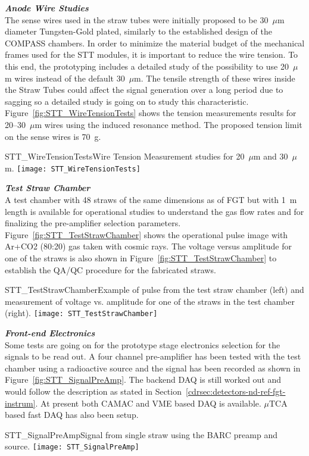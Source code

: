 \textbf{ \textit{Anode Wire Studies}} \\
The sense wires used in the straw tubes were initially proposed to be
30~$\mu$m diameter Tungsten-Gold plated, similarly to the established
design of the COMPASS chambers. In order to minimize the material
budget of the mechanical frames used for the STT modules, it is
important to reduce the wire tension. To this end, the prototyping
includes a detailed study of the possibility to use 20~$\mu$m wires
instead of the default 30~$\mu$m. The tensile strength of these wires
inside the Straw Tubes could affect the signal generation over a long
period due to sagging so a detailed study is going on to study this
characteristic. Figure~\ref{fig:STT_WireTensionTests} shows the
tension measurements results for 20--30~$\mu$m wires using the induced
resonance method.  The proposed tension limit on the sense wires is
70~g.
\begin{cdrfigure}
{STT_WireTensionTests}{Wire Tension Measurement studies for 20~$\mu$m and 30~$\mu$m.}
\texttt{[image: STT\_WireTensionTests]}
\end{cdrfigure}


\textbf{ \textit{Test Straw Chamber}} \\
A test chamber with 48 straws of the same dimensions as of FGT but
with 1~m length is available for operational studies to understand
the gas flow rates and for finalizing the pre-amplifier selection
parameters.  Figure~\ref{fig:STT_TestStrawChamber} shows the
operational pulse image with Ar+CO2 (80:20) gas taken with cosmic
rays. The voltage versus amplitude for one of the straws is also shown
in Figure~\ref{fig:STT_TestStrawChamber} to establish the QA/QC
procedure for the fabricated straws.
\begin{cdrfigure}
{STT_TestStrawChamber}{Example of pulse from the test straw chamber (left) and
measurement of voltage vs. amplitude for one of the straws in the test chamber (right).}
\texttt{[image: STT\_TestStrawChamber]}
\end{cdrfigure}


\textbf{ \textit{Front-end Electronics}} \\
Some tests are going on for the prototype stage electronics selection
for the signals to be read out.  A four channel pre-amplifier has been
tested with the test chamber using a radioactive source and the signal
has been recorded as shown in Figure~\ref{fig:STT_SignalPreAmp}.  The
backend DAQ is still worked out and would follow the description as
stated in Section~\ref{cdrsec:detectors-nd-ref-fgt-instrum}. At
present both CAMAC and VME based DAQ is available. $\mu$TCA based fast
DAQ has also been setup.
\begin{cdrfigure}
{STT_SignalPreAmp}{Signal from single straw using the BARC preamp and source.}
\texttt{[image: STT\_SignalPreAmp]}
\end{cdrfigure}


